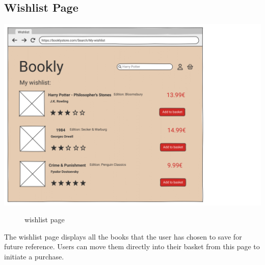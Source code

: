 \subsection{Wishlist Page} \label{sec:wishlist}
\includegraphics[width=0.6\linewidth]{HW1Report/photos/wishlist.png}

\begin{figure}[h!]
    \centering
    \caption{wishlist page}
    \label{fig:enter-label}
\end{figure}
The wishlist page displays all the books that the user has chosen to save for future reference. Users can move them directly into their basket from this page to initiate a purchase.